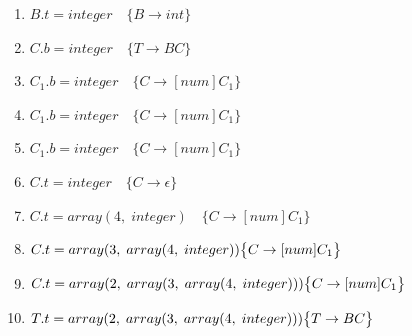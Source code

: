\documentclass[11pt]{article}
\begin{document}
\begin{center}
\begin{minipage}[t]{\linewidth}
\begin{multicols}{2}
\begin{enumerate}
        \small 
        \item $B.t = integer \quad \big \{B \rightarrow int\big\}$ 
        \item $C.b = integer \quad \big \{T \rightarrow BC\big\}$
        \item $C_1.b = integer \quad \big \{C \rightarrow [num]C_1\big\}$
        \item $C_1.b = integer \quad \big \{C \rightarrow [num]C_1\big\}$
        \item $C_1.b = integer \quad \big \{C \rightarrow [num]C_1\big\}$
        \item $C.t = integer \quad \big \{C \rightarrow \epsilon\big\}$
        \item $C.t = array(4,\; integer)\quad \big \{C \rightarrow [num]C_1\big\}$
        \item $C.t = array(3,\;array(4,\;integer)) \newline \big \{C \rightarrow [num]C_1\big\}$
        \item $C.t = array(2,\;array(3,\;array(4,\;integer)))
        \newline \big \{C \rightarrow [num]C_1\big\}$
        \item  $T.t = array(2,\;array(3,\;array(4,\;integer))) \newline \big \{T \rightarrow BC \big\}$
      \end{enumerate}
    \end{multicols}
  \end{minipage}
\end{center}
\end{document}
